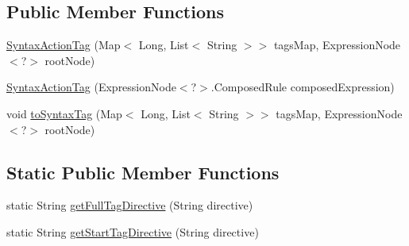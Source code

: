 \subsection*{Public Member Functions}
\begin{DoxyCompactItemize}
\item 
\hyperlink{classit_1_1emarolab_1_1cagg_1_1core_1_1evaluation_1_1semanticGrammar_1_1SyntaxActionTag_a5ae4f61336b5e03cda04eb612bec1b84}{Syntax\-Action\-Tag} (Map$<$ Long, List$<$ String $>$$>$ tags\-Map, Expression\-Node$<$?$>$ root\-Node)
\item 
\hyperlink{classit_1_1emarolab_1_1cagg_1_1core_1_1evaluation_1_1semanticGrammar_1_1SyntaxActionTag_ab59438545302ddefc9d74fef808c8f9e}{Syntax\-Action\-Tag} (Expression\-Node$<$?$>$.Composed\-Rule composed\-Expression)
\item 
void \hyperlink{classit_1_1emarolab_1_1cagg_1_1core_1_1evaluation_1_1semanticGrammar_1_1SyntaxActionTag_aaed86e3866fd79b27da25ac340867952}{to\-Syntax\-Tag} (Map$<$ Long, List$<$ String $>$$>$ tags\-Map, Expression\-Node$<$?$>$ root\-Node)
\end{DoxyCompactItemize}
\subsection*{Static Public Member Functions}
\begin{DoxyCompactItemize}
\item 
static String \hyperlink{classit_1_1emarolab_1_1cagg_1_1core_1_1evaluation_1_1semanticGrammar_1_1SyntaxActionTag_ac39d9f618a38aa77ade9c57b0b07f5e9}{get\-Full\-Tag\-Directive} (String directive)
\item 
static String \hyperlink{classit_1_1emarolab_1_1cagg_1_1core_1_1evaluation_1_1semanticGrammar_1_1SyntaxActionTag_a6ee591a5723e3a8c1918474f508e9e76}{get\-Start\-Tag\-Directive} (String directive)
\end{DoxyCompactItemize}
